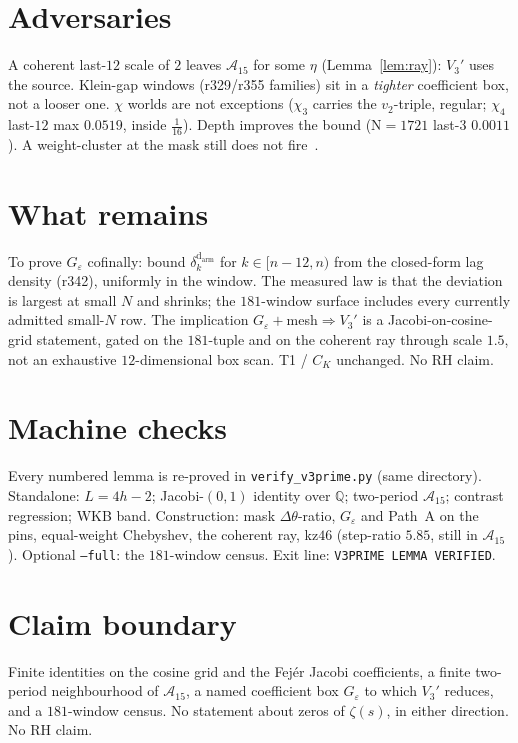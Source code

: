 \documentclass[11pt]{article}
\theoremstyle{remark}
\newcommand{\Q}{\mathbb{Q}}
\begin{document}
\section{Adversaries}\label{sec:adv}

A coherent last-$12$ scale of $2$ leaves $\mathcal{A}_{15}$ for
some $\eta$ (Lemma~\ref{lem:ray}): $V_3'$ uses the source.
Klein-gap windows (r329/r355 families) sit in a \emph{tighter}
coefficient box, not a looser one.  $\chi$ worlds are not
exceptions ($\chi_3$ carries the $v_2$-triple, regular;
$\chi_4$ last-$12$ max $0.0519$, inside $\tfrac1{16}$).
Depth improves the bound (N$=1721$ last-$3$ $0.0011$).
A weight-cluster at the mask still does not fire~\cite{v2lem}.

\section{What remains}\label{sec:rest}

To prove $G_\varepsilon$ cofinally: bound
$\delta_k^{\mathrm{d_{arm}}}$ for $k\in[n-12,n)$ from the
closed-form lag density (r342), uniformly in the window.  The
measured law is that the deviation is largest at small $N$ and
shrinks; the $181$-window surface includes every currently
admitted small-$N$ row.  The implication
$G_\varepsilon+$mesh$\Rightarrow V_3'$ is a Jacobi-on-cosine-grid
statement, gated on the $181$-tuple and on the coherent ray
through scale $1.5$, not an exhaustive $12$-dimensional box
scan.  T1 / $C_K$ unchanged.  No RH claim.

\section{Machine checks}\label{sec:machine}

Every numbered lemma is re-proved in
\texttt{verify\_v3prime.py} (same directory).  Standalone:
$L=4h-2$; Jacobi-$(0,1)$ identity over $\Q$; two-period
$\mathcal{A}_{15}$; contrast regression; WKB band.
Construction: mask $\Delta\theta$-ratio, $G_\varepsilon$ and
Path~A on the pins, equal-weight Chebyshev, the coherent ray,
kz$46$ (step-ratio $5.85$, still in $\mathcal{A}_{15}$).
Optional \texttt{--full}: the $181$-window census.
Exit line: \texttt{V3PRIME LEMMA VERIFIED}.

\section*{Claim boundary}

Finite identities on the cosine grid and the Fej\'er Jacobi
coefficients, a finite two-period neighbourhood of
$\mathcal{A}_{15}$, a named coefficient box $G_\varepsilon$ to
which $V_3'$ reduces, and a $181$-window census.  No statement
about zeros of $\zeta(s)$, in either direction.  No RH claim.
\end{document}

